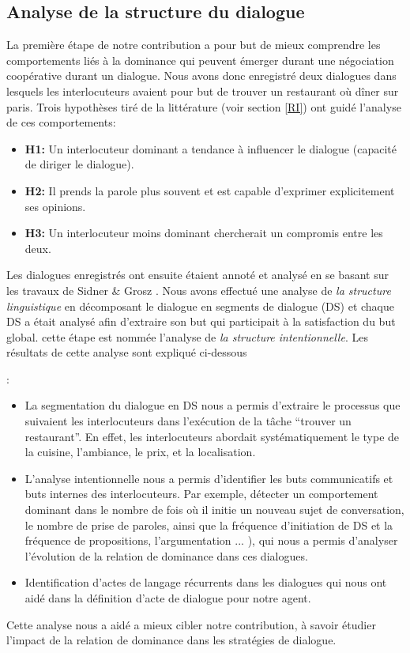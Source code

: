 \documentclass [french]{sig-alternate-05-2015}
\begin{document}
\subsection{Analyse de la structure du dialogue}

{ \color{red}La première étape de notre contribution a pour but de mieux comprendre les comportements liés à la dominance qui peuvent émerger durant une négociation coopérative durant un dialogue. Nous avons donc enregistré deux dialogues dans lesquels les interlocuteurs avaient pour but de trouver un restaurant où dîner sur paris. Trois hypothèses tiré de la littérature (voir section \ref{RI}) ont guidé l'analyse de ces comportements: 
\begin{itemize}
\item \textbf{H1:} Un interlocuteur dominant a tendance à influencer le dialogue (capacité de diriger le dialogue).
\item \textbf{H2:} Il prends la parole plus souvent et est capable d'exprimer explicitement ses opinions.
\item \textbf{H3:} Un interlocuteur moins dominant chercherait un compromis entre les deux. 
\end{itemize}
 Les dialogues enregistrés ont ensuite étaient annoté et analysé en se basant sur les travaux de Sidner \& Grosz \cite{grosz1986attention}. Nous avons effectué une analyse de \textit{la structure linguistique}  en décomposant le dialogue en segments de dialogue (DS)  et chaque DS a était analysé afin d'extraire son but qui participait à la satisfaction du but global. cette étape est nommée l'analyse de \textit{la structure intentionnelle}. Les résultats de cette analyse sont expliqué ci-dessous}: 

\begin{itemize}

		\item  La segmentation du dialogue en DS nous a permis d'extraire le processus que suivaient les interlocuteurs dans l'exécution de la tâche  ``trouver un restaurant''. En effet, les interlocuteurs abordait systématiquement le type de la cuisine, l'ambiance, le prix, et la localisation. 
		\item L'analyse intentionnelle nous a permis d'identifier les buts communicatifs et buts internes des interlocuteurs. Par exemple, détecter un comportement dominant dans le nombre de fois où il initie un nouveau sujet de conversation, le nombre de prise de paroles, ainsi que la fréquence d'initiation de DS et la fréquence de propositions, l'argumentation ... ), qui nous a permis d'analyser l'évolution de la relation de dominance dans ces dialogues. 
		\item Identification d'actes de langage récurrents dans les dialogues qui nous ont aidé dans la définition d'acte de dialogue pour notre agent.	
	
\end{itemize}
\par Cette analyse nous a aidé a mieux cibler notre contribution, à savoir étudier l'impact de la relation de dominance dans les stratégies de dialogue.
\end{document}
